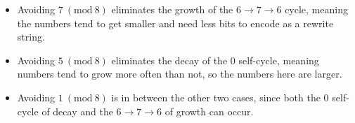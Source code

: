 \documentclass[12pt]{article}
\newcommand{\Mod}[1]{\ (\mathrm{mod}\ #1)}
\theoremstyle{definition}
\begin{document}
\begin{itemize}
    \item Avoiding $7 \Mod{8}$ eliminates the growth of the $6 \rightarrow 7 \rightarrow 6$ cycle, meaning the numbers tend to get smaller and need less bits to encode as a rewrite string.
    \item Avoiding $5 \Mod{8}$ eliminates the decay of the 0 self-cycle, meaning numbers tend to grow more often than not, so the numbers here are larger.
    \item Avoiding $1 \Mod{8}$ is in between the other two cases, since both the 0 self-cycle of decay and the $6 \rightarrow 7 \rightarrow 6$ of growth can occur.
\end{itemize}
\end{document}
